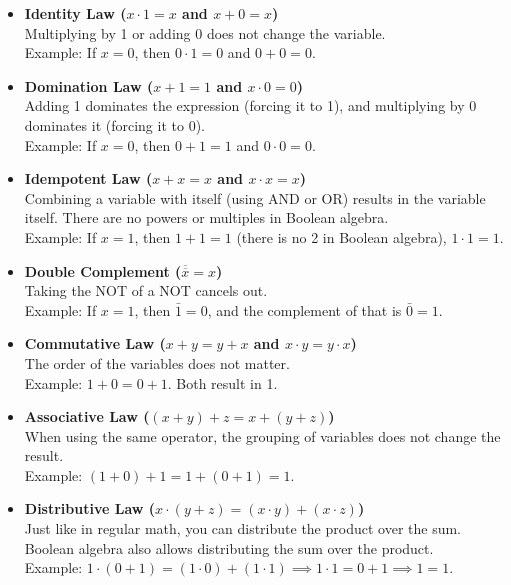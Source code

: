 \begin{itemize}
    \item \textbf{Identity Law ($x \cdot 1 = x$ and $x + 0 = x$)} \\
    Multiplying by 1 or adding 0 does not change the variable. \\
    Example: If $x = 0$, then $0 \cdot 1 = 0$ and $0 + 0 = 0$.
    
    \item \textbf{Domination Law ($x + 1 = 1$ and $x \cdot 0 = 0$)} \\
    Adding 1 dominates the expression (forcing it to 1), and multiplying by 0 dominates it (forcing it to 0). \\
    Example: If $x = 0$, then $0 + 1 = 1$ and $0 \cdot 0 = 0$.

    \item \textbf{Idempotent Law ($x + x = x$ and $x \cdot x = x$)} \\
    Combining a variable with itself (using AND or OR) results in the variable itself. There are no powers or multiples in Boolean algebra. \\
    Example: If $x = 1$, then $1 + 1 = 1$ (there is no 2 in Boolean algebra), $1 \cdot 1 = 1$.
    
    \item \textbf{Double Complement ($\overline{\overline{x}} = x$)} \\
    Taking the NOT of a NOT cancels out. \\
    Example: If $x = 1$, then $\bar{1} = 0$, and the complement of that is $\bar{0} = 1$.
    
    \item \textbf{Commutative Law ($x + y = y + x$ and $x \cdot y = y \cdot x$)} \\
    The order of the variables does not matter. \\
    Example: $1 + 0 = 0 + 1$. Both result in 1.
    
    \item \textbf{Associative Law ($(x + y) + z = x + (y + z)$)} \\
    When using the same operator, the grouping of variables does not change the result. \\
    Example: $(1 + 0) + 1 = 1 + (0 + 1) = 1$.
    
    \item \textbf{Distributive Law ($x \cdot (y + z) = (x \cdot y) + (x \cdot z)$)} \\
    Just like in regular math, you can distribute the product over the sum. Boolean algebra also allows distributing the sum over the product. \\
    Example: $1 \cdot (0 + 1) = (1 \cdot 0) + (1 \cdot 1) \implies 1 \cdot 1 = 0 + 1 \implies 1 = 1$.
    

\end{itemize}
